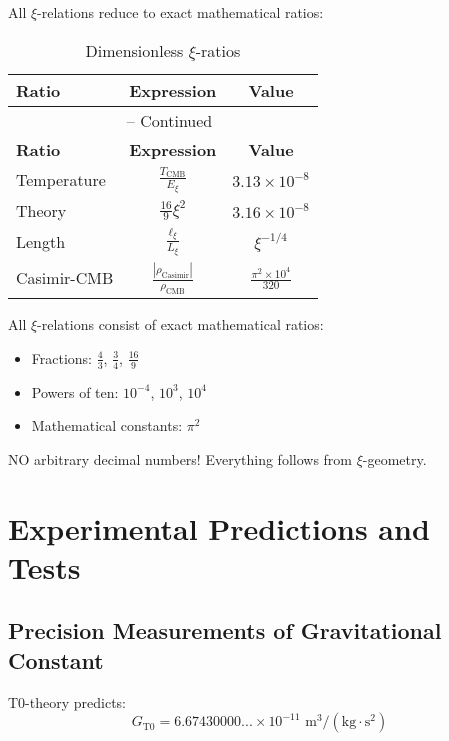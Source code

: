 \documentclass[12pt,a4paper]{article}
\begin{document}
	All $\xi$-relations reduce to exact mathematical ratios:
	
	\begin{longtable}{lcc}
		\caption{Dimensionless $\xi$-ratios} \\
		\toprule
		\textbf{Ratio} & \textbf{Expression} & \textbf{Value} \\
		\midrule
		\endfirsthead
		\multicolumn{3}{c}{\tablename\ \thetable{} -- Continued} \\
		\toprule
		\textbf{Ratio} & \textbf{Expression} & \textbf{Value} \\
		\midrule
		\endhead
		Temperature & $\frac{T_{\text{CMB}}}{E_\xi}$ & $3.13 \times 10^{-8}$ \\
		Theory & $\frac{16}{9}\xi^2$ & $3.16 \times 10^{-8}$ \\
		Length & $\frac{\ell_{\xi}}{L_\xi}$ & $\xi^{-1/4}$ \\
		Casimir-CMB & $\frac{|\rho_{\text{Casimir}}|}{\rho_{\text{CMB}}}$ & $\frac{\pi^2 \times 10^4}{320}$ \\
		\bottomrule
	\end{longtable}
	
	\begin{important}
		All $\xi$-relations consist of exact mathematical ratios:
		\begin{itemize}
			\item Fractions: $\frac{4}{3}$, $\frac{3}{4}$, $\frac{16}{9}$
			\item Powers of ten: $10^{-4}$, $10^3$, $10^4$
			\item Mathematical constants: $\pi^2$
		\end{itemize}
		NO arbitrary decimal numbers! Everything follows from $\xi$-geometry.
	\end{important}
	
	\section{Experimental Predictions and Tests}
	
	\subsection{Precision Measurements of Gravitational Constant}
	
	T0-theory predicts:
	\begin{equation}
		G_{\text{T0}} = 6.67430000... \times 10^{-11} \text{ m}^3/(\text{kg} \cdot \text{s}^2)
	\end{equation}
	
\end{document}
